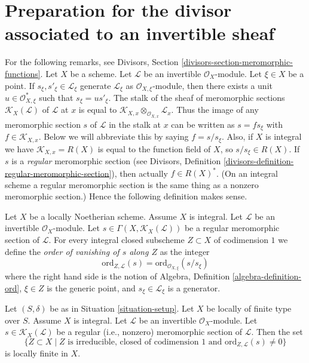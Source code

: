 \section{Preparation for the divisor associated to an invertible sheaf}
\label{section-preparation-divisor-sheaf}

\noindent
For the following remarks, see
Divisors, Section \ref{divisors-section-meromorphic-functions}.
Let $X$ be a scheme.
Let $\mathcal{L}$ be an invertible $\mathcal{O}_X$-module.
Let $\xi \in X$ be a point.
If $s_\xi, s'_\xi \in \mathcal{L}_\xi$ generate $\mathcal{L}_\xi$
as $\mathcal{O}_{X, \xi}$-module, then there exists a unit
$u \in \mathcal{O}_{X, \xi}^*$ such that $s_\xi = u s'_\xi$.
The stalk of the sheaf of meromorphic sections
$\mathcal{K}_X(\mathcal{L})$ of $\mathcal{L}$
at $x$ is equal to
$\mathcal{K}_{X, x} \otimes_{\mathcal{O}_{X, x}} \mathcal{L}_x$.
Thus the image of any meromorphic section $s$
of $\mathcal{L}$ in the stalk at $x$ can be written as $s = fs_\xi$ with
$f \in \mathcal{K}_{X, x}$. Below we will abbreviate this by
saying $f = s/s_\xi$. Also, if $X$ is integral we have
$\mathcal{K}_{X, x} = R(X)$ is equal to the function field of $X$,
so $s/s_\xi \in R(X)$. If $s$ is a {\it regular} meromorphic
section (see
Divisors, Definition \ref{divisors-definition-regular-meromorphic-section}),
then actually $f \in R(X)^*$. (On an integral scheme a regular
meromorphic section is the same thing as a nonzero meromorphic section.)
Hence the following definition makes sense.

\begin{definition}
\label{definition-order-vanishing-meromorphic}
Let $X$ be a locally Noetherian scheme. Assume $X$ is integral.
Let $\mathcal{L}$ be an invertible $\mathcal{O}_X$-module.
Let $s \in \Gamma(X, \mathcal{K}_X(\mathcal{L}))$
be a regular meromorphic section of $\mathcal{L}$.
For every integral closed subscheme
$Z \subset X$ of codimension $1$ we define
the {\it order of vanishing of $s$ along $Z$} as the integer
$$
\text{ord}_{Z, \mathcal{L}}(s)
= \text{ord}_{\mathcal{O}_{X, \xi}}(s/s_\xi)
$$
where the right hand side is the notion of
Algebra, Definition \ref{algebra-definition-ord},
$\xi \in Z$ is the generic point,
and $s_\xi \in \mathcal{L}_\xi$ is a generator.
\end{definition}

\begin{lemma}
\label{lemma-divisor-meromorphic-locally-finite}
Let $(S, \delta)$ be as in Situation \ref{situation-setup}.
Let $X$ be locally of finite type over $S$. Assume $X$ is
integral. Let $\mathcal{L}$ be an invertible $\mathcal{O}_X$-module.
Let $s \in \mathcal{K}_X(\mathcal{L})$ be a regular (i.e., nonzero)
meromorphic section of $\mathcal{L}$. Then the set
$$
\{Z \subset X \mid Z \text{ is irreducible, closed of codimension }1
\text{ and }\text{ord}_{Z, \mathcal{L}}(s) \not = 0\}
$$
is locally finite in $X$.
\end{lemma}

